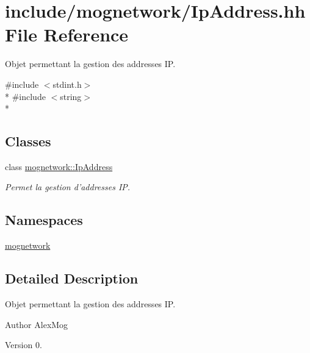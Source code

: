 \hypertarget{_ip_address_8hh}{\section{include/mognetwork/\-Ip\-Address.hh File Reference}
\label{_ip_address_8hh}
}


Objet permettant la gestion des addresses I\-P.  


{\ttfamily \#include $<$stdint.\-h$>$}\\*
{\ttfamily \#include $<$string$>$}\\*
\subsection*{Classes}
\begin{DoxyCompactItemize}
\item 
class \hyperlink{classmognetwork_1_1_ip_address}{mognetwork\-::\-Ip\-Address}
\begin{DoxyCompactList}\small\item\em Permet la gestion d'addresses I\-P. \end{DoxyCompactList}\end{DoxyCompactItemize}
\subsection*{Namespaces}
\begin{DoxyCompactItemize}
\item 
\hyperlink{namespacemognetwork}{mognetwork}
\end{DoxyCompactItemize}


\subsection{Detailed Description}
Objet permettant la gestion des addresses I\-P. \begin{DoxyAuthor}{Author}
Alex\-Mog 
\end{DoxyAuthor}
\begin{DoxyVersion}{Version}
0. 
\end{DoxyVersion}
